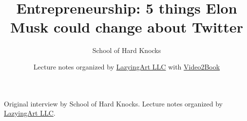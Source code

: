 \documentclass[11pt,oneside]{book}
\begin{document}
\frontmatter
\title{Entrepreneurship: 5 things Elon Musk could change about Twitter}
\author{School of Hard Knocks}
\date{Lecture notes organized by \href{https://lazying.art}{LazyingArt LLC} with \href{https://github.com/lachlanchen/Video2Book}{Video2Book}}
\maketitle
\begin{center}
\small Original interview by School of Hard Knocks. Lecture notes organized by \href{https://lazying.art}{LazyingArt LLC}.
\end{center}
\clearpage
\mainmatter

\end{document}

